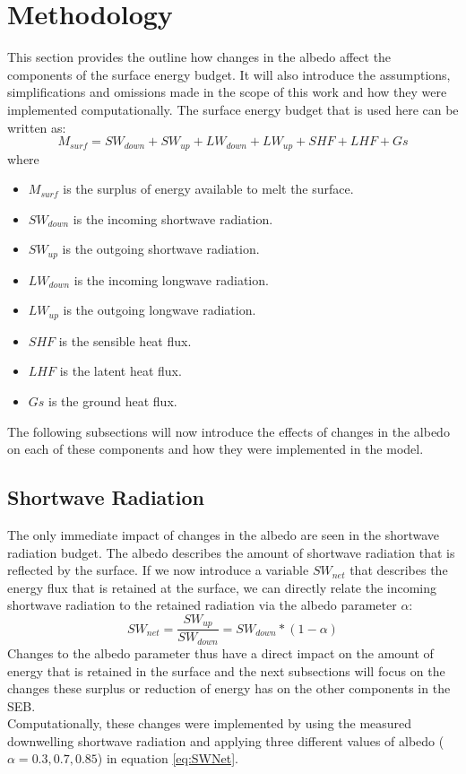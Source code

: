 \documentclass{article}
\begin{document}
\section{Methodology}
This section provides the outline how changes in the albedo affect the components of the surface energy budget. 
It will also introduce the assumptions, simplifications and omissions made in the scope of this work and how they were implemented computationally.
The surface energy budget that is used here can be written as:
\begin{equation} \label{eq:SEB}
  M_{surf} = SW_{down} + SW_{up} + LW_{down} + LW_{up} + SHF + LHF + Gs
\end{equation}
where \vspace{-0.5\baselineskip}
\begin{itemize}[noitemsep]
  \item $M_{surf}$ is the surplus of energy available to melt the surface.
  \item $SW_{down}$ is the incoming shortwave radiation. 
  \item $SW_{up}$ is the outgoing shortwave radiation. 
  \item $LW_{down}$ is the incoming longwave radiation. 
  \item $LW_{up}$ is the outgoing longwave radiation.
  \item $SHF$ is the sensible heat flux. 
  \item $LHF$ is the latent heat flux. 
  \item $Gs$ is the ground heat flux.
\end{itemize}
The following subsections will now introduce the effects of changes in the albedo on each of these components and how they were implemented in the model.

\subsection*{Shortwave Radiation}

The only immediate impact of changes in the albedo are seen in the shortwave radiation budget. 
The albedo describes the amount of shortwave radiation that is reflected by the surface. 
If we now introduce a variable $SW_{net}$ that describes the energy flux that is retained at the surface, we can directly relate the incoming shortwave radiation to the retained radiation via the albedo parameter $\alpha$:
\begin{equation} \label{eq:SWNet}
  SW_{net} = \frac{SW_{up}}{SW_{down}} = SW_{down} * (1-\alpha)
\end{equation}
Changes to the albedo parameter thus have a direct impact on the amount of energy that is retained in the surface and the next subsections will focus on the changes these surplus or reduction of energy has on the other components in the SEB. \\
Computationally, these changes were implemented by using the measured downwelling shortwave radiation and applying three different values of albedo ($\alpha = 0.3, 0.7, 0.85$) in equation \eqref{eq:SWNet}. 
\end{document}
